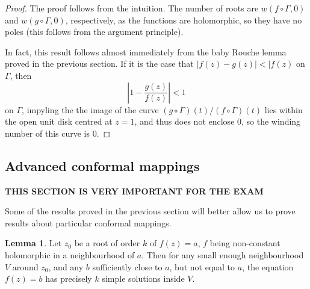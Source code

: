 \documentclass[aps,pra,showpacs,notitlepage,onecolumn,superscriptaddress,nofootinbib]{revtex4-1}
\theoremstyle{definition}
\newtheorem{lemma}{Lemma}[section]
\begin{document}
\begin{proof}
  The proof follows from the intuition. The number of roots are $w(f \circ \Gamma, 0)$ and $w(g \circ \Gamma, 0)$, respectively, as the functions are holomorphic, so they have no poles (this follows from the argument principle).
  \newline

  \noindent In fact, this result follows almost immediately from
  the baby Rouche lemma proved in the previous section. If it is the case that $|f(z) - g(z)| < |f(z)$ on $\Gamma$, then
  \begin{equation}
    \left| 1 - \frac{g(z)}{f(z)} \right| < 1
  \end{equation}
  on $\Gamma$, impyling the the image of the curve $(g \circ \Gamma)(t) / (f \circ \Gamma)(t)$ lies within the open unit disk centred at $z = 1$, and thus does not enclose $0$,
  so the winding number of this curve is $0$.
  \end{proof}

\subsection{Advanced conformal mappings}

\noindent \textbf{THIS SECTION IS VERY IMPORTANT FOR THE EXAM}
\newline

\noindent Some of the results proved in the previous section will better allow us to prove results about particular conformal mappings.

\begin{lemma}
  Let $z_0$ be a root of order $k$ of $f(z) = a$, $f$ being non-constant holomorphic in a neighbourhood of $a$. Then for any small enough
  neighbourhood $V$ around $z_0$, and any $b$ sufficiently close to $a$, but not equal to $a$, the equation $f(z) = b$ has precisely $k$
  simple solutions inside $V$.
\end{lemma}
\end{document}
